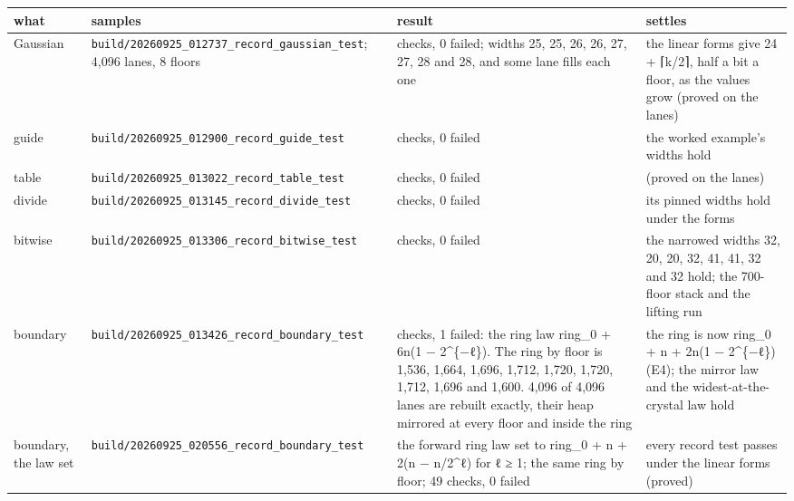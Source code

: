 {\footnotesize
\setlength{\tabcolsep}{6pt}
\begin{longtable}{>{\RaggedRight\arraybackslash}p{}>{\RaggedRight\arraybackslash}p{}>{\RaggedRight\arraybackslash}p{}>{\RaggedRight\arraybackslash}p{}}
\toprule
what & samples & result & settles \\
\midrule
\endhead
Gaussian & \texttt{build/\allowbreak{}20260925\_\allowbreak{}012737\_\allowbreak{}record\_\allowbreak{}gaussian\_\allowbreak{}test}; 4,096 lanes, 8 floors & 11 checks, 0 failed; widths 25, 25, 26, 26, 27, 27, 28 and 28, and some lane fills each one & the linear forms give 24 + ⌈k/2⌉, half a bit a floor, as the values grow (proved on the lanes) \\
guide & \texttt{build/\allowbreak{}20260925\_\allowbreak{}012900\_\allowbreak{}record\_\allowbreak{}guide\_\allowbreak{}test} & 12 checks, 0 failed & the worked example's widths hold \\
table & \texttt{build/\allowbreak{}20260925\_\allowbreak{}013022\_\allowbreak{}record\_\allowbreak{}table\_\allowbreak{}test} & 16 checks, 0 failed & (proved on the lanes) \\
divide & \texttt{build/\allowbreak{}20260925\_\allowbreak{}013145\_\allowbreak{}record\_\allowbreak{}divide\_\allowbreak{}test} & 20 checks, 0 failed & its pinned widths hold under the forms \\
bitwise & \texttt{build/\allowbreak{}20260925\_\allowbreak{}013306\_\allowbreak{}record\_\allowbreak{}bitwise\_\allowbreak{}test} & 25 checks, 0 failed & the narrowed widths 32, 20, 20, 32, 41, 41, 32 and 32 hold; the 700-floor stack and the lifting run \\
boundary & \texttt{build/\allowbreak{}20260925\_\allowbreak{}013426\_\allowbreak{}record\_\allowbreak{}boundary\_\allowbreak{}test} & 49 checks, 1 failed: the ring law ring\_\allowbreak{}0 + 6n(1 − 2\textasciicircum{}\{−ℓ\}). The ring by floor is 1,536, 1,664, 1,696, 1,712, 1,720, 1,720, 1,712, 1,696 and 1,600. 4,096 of 4,096 lanes are rebuilt exactly, their heap mirrored at every floor and inside the ring & the ring is now ring\_\allowbreak{}0 + n + 2n(1 − 2\textasciicircum{}\{−ℓ\}) (E4); the mirror law and the widest-at-the-crystal law hold \\
boundary, the law set & \texttt{build/\allowbreak{}20260925\_\allowbreak{}020556\_\allowbreak{}record\_\allowbreak{}boundary\_\allowbreak{}test} & the forward ring law set to ring\_\allowbreak{}0 + n + 2(n − n/2\textasciicircum{}ℓ) for ℓ ≥ 1; the same ring by floor; 49 checks, 0 failed & every record test passes under the linear forms (proved) \\

\end{longtable}}
